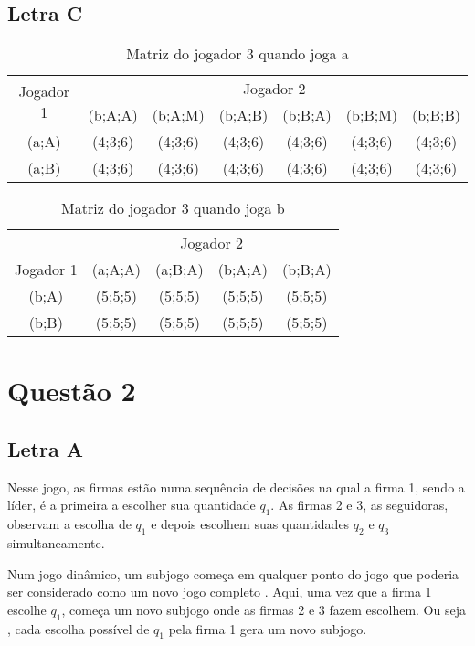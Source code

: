 \documentclass[a4paper,12pt]{article}[abntex2]
\begin{document}
\subsection{\textbf{Letra C}}
\begin{table}[H]
\centering
\begin{tabular}{|c|c|c|c|c|c|c|}
\hline
\multicolumn{1}{|c|}{\multirow{2}{*}{Jogador 1}} & \multicolumn{6}{c|}{Jogador 2} \\ \cline{2-7} 
\multicolumn{1}{|c|}{} & (b;A;A) & (b;A;M) & (b;A;B) & (b;B;A) & (b;B;M) & (b;B;B) \\ \hline
(a;A) & (4;3;6) & (4;3;6) & (4;3;6) & (4;3;6) & (4;3;6) & (4;3;6) \\ \hline
(a;B) & (4;3;6) & (4;3;6) & (4;3;6) & (4;3;6) & (4;3;6) & (4;3;6) \\ \hline
\end{tabular}
\caption{Matriz do jogador 3 quando joga a}
\end{table}
\begin{table}[H]
\centering
\begin{tabular}{|c|c|c|c|c|}
\hline
 & \multicolumn{4}{c|}{Jogador 2} \\ \cline{2-5} 
Jogador 1 & (a;A;A) & (a;B;A) & (b;A;A) & (b;B;A) \\ \hline
(b;A) & (5;5;5) & (5;5;5) & (5;5;5) & (5;5;5) \\ \hline
(b;B) & (5;5;5) & (5;5;5) & (5;5;5) & (5;5;5) \\ \hline
\end{tabular}
\caption{Matriz do jogador 3 quando joga b}
\end{table}


\section{\textbf{Questão 2}}
\subsection{\textbf{Letra A}}
Nesse jogo, as firmas estão numa sequência de decisões na qual a firma 1, sendo a líder, é a primeira a escolher sua quantidade \( q_1 \). As firmas 2 e 3, as seguidoras, observam a escolha de \( q_1 \) e depois escolhem suas quantidades \( q_2 \) e \( q_3 \) simultaneamente.

Num jogo dinâmico, um subjogo começa em qualquer ponto do jogo que poderia ser considerado como um novo jogo completo . Aqui, uma vez que a firma 1 escolhe \( q_1 \), começa um novo subjogo onde as firmas 2 e 3 fazem escolhem. Ou seja , cada escolha possível de \( q_1 \) pela firma 1 gera um novo subjogo.
\end{document}

